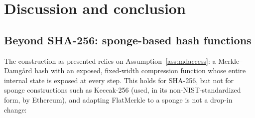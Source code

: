 \section{Discussion and conclusion}
\label{sec:conclusion}

\subsection{Beyond SHA-256: sponge-based hash functions}

The construction as presented relies on Assumption~\ref{ass:mdaccess}: a
Merkle--Damg\aa rd hash with an exposed, fixed-width compression function
whose entire internal state is exposed at every step. This holds for
SHA-256, but not for sponge constructions such as Keccak-256 (used, in its
non-NIST-standardized form, by Ethereum), and adapting FlatMerkle to a
sponge is not a drop-in change:

